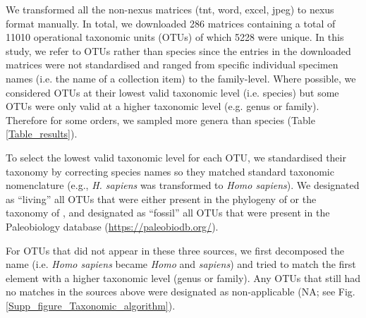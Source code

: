 We transformed all the non-nexus matrices (tnt, word, excel, jpeg) to nexus format manually.
In total, we downloaded 286 matrices containing a total of 11010 operational taxonomic units (OTUs) of which 5228 were unique.
In this study, we refer to OTUs rather than species since the entries in the downloaded matrices were not standardised and ranged from specific individual specimen names (i.e. the name of a collection item) to the family-level.
Where possible, we considered OTUs at their lowest valid taxonomic level (i.e. species) but some OTUs were only valid at a higher taxonomic level (e.g. genus or family).
Therefore for some orders, we sampled more genera than species (Table \ref{Table_results}).

To select the lowest valid taxonomic level for each OTU, we standardised their taxonomy by correcting species names so they matched standard taxonomic nomenclature (e.g., \textit{H. sapiens} was transformed to \textit{Homo sapiens}).
We designated as ``living'' all OTUs that were either present in the phylogeny of \citep{BinindaEmonds} or the taxonomy of \citep{wilson2005mammal}, and designated as ``fossil'' all OTUs that were present in the Paleobiology database (\url{https://paleobiodb.org/}).

For OTUs that did not appear in these three sources, we first decomposed the name (i.e. \textit{Homo sapiens} became \textit{Homo} and \textit{sapiens}) and tried to match the first element with a higher taxonomic level (genus or family).
Any OTUs that still had no matches in the sources above were designated as non-applicable (NA; see Fig. \ref{Supp_figure_Taxonomic_algorithm}).

